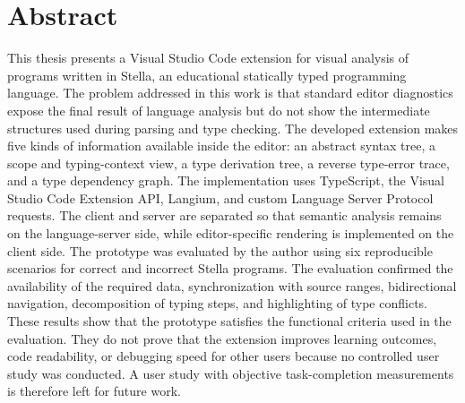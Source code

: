 ﻿\chapter*{Abstract}

This thesis presents a Visual Studio Code extension for visual analysis of programs written in Stella, an educational statically typed programming language. The problem addressed in this work is that standard editor diagnostics expose the final result of language analysis but do not show the intermediate structures used during parsing and type checking. The developed extension makes five kinds of information available inside the editor: an abstract syntax tree, a scope and typing-context view, a type derivation tree, a reverse type-error trace, and a type dependency graph. The implementation uses TypeScript, the Visual Studio Code Extension API, Langium, and custom Language Server Protocol requests. The client and server are separated so that semantic analysis remains on the language-server side, while editor-specific rendering is implemented on the client side. The prototype was evaluated by the author using six reproducible scenarios for correct and incorrect Stella programs. The evaluation confirmed the availability of the required data, synchronization with source ranges, bidirectional navigation, decomposition of typing steps, and highlighting of type conflicts. These results show that the prototype satisfies the functional criteria used in the evaluation. They do not prove that the extension improves learning outcomes, code readability, or debugging speed for other users because no controlled user study was conducted. A user study with objective task-completion measurements is therefore left for future work.
